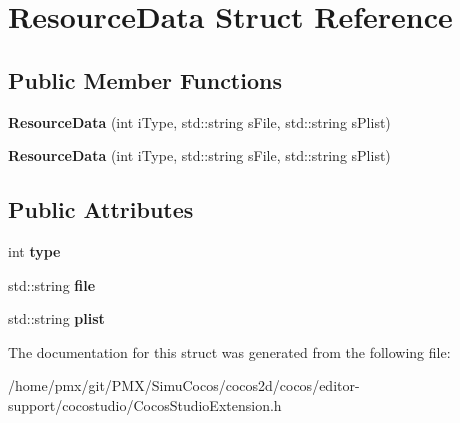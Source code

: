 \hypertarget{structResourceData}{}\section{Resource\+Data Struct Reference}
\label{structResourceData}
\subsection*{Public Member Functions}
\begin{DoxyCompactItemize}
\item 
\mbox{\label{structResourceData_a20c0de78dab0e9a18264080c1fa63aa6}} 
{\bfseries Resource\+Data} (int i\+Type, std\+::string s\+File, std\+::string s\+Plist)
\item 
\mbox{\label{structResourceData_a20c0de78dab0e9a18264080c1fa63aa6}} 
{\bfseries Resource\+Data} (int i\+Type, std\+::string s\+File, std\+::string s\+Plist)
\end{DoxyCompactItemize}
\subsection*{Public Attributes}
\begin{DoxyCompactItemize}
\item 
\mbox{\label{structResourceData_ab5d82c858a75687f75cfe74bc0a79422}} 
int {\bfseries type}
\item 
\mbox{\label{structResourceData_a778aec1b6566052c3fb6c21198965dcd}} 
std\+::string {\bfseries file}
\item 
\mbox{\label{structResourceData_a720e778a07fc6a3030dc29d10fac3e1c}} 
std\+::string {\bfseries plist}
\end{DoxyCompactItemize}


The documentation for this struct was generated from the following file\+:\begin{DoxyCompactItemize}
\item 
/home/pmx/git/\+P\+M\+X/\+Simu\+Cocos/cocos2d/cocos/editor-\/support/cocostudio/Cocos\+Studio\+Extension.\+h\end{DoxyCompactItemize}
